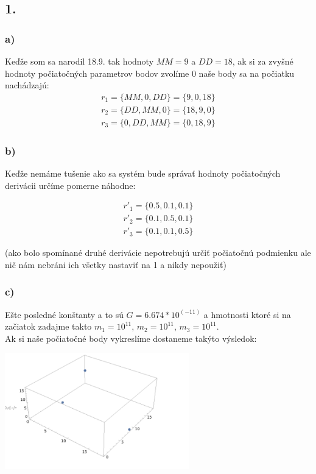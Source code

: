 \documentclass[a4paper]{article}
\begin{document}
	\subsection{1.}
	\subsubsection{a)}
	Keďže som sa narodil 18.9. tak hodnoty $MM=9$ a $DD=18$, ak si za zvyšné hodnoty počiatočných parametrov bodov zvolíme 0 naše body sa na počiatku nachádzajú:
	\begin{align*}
		r_1=\{MM, 0,DD\} = \{9,0,18\}\\
		r_2=\{DD,MM, 0\}= \{18, 9,0\}\\
		r_3=\{0, DD, MM\}= \{0,18,9\}
	\end{align*}
	
	\subsubsection{b)}
	Keďže nemáme tušenie ako sa systém bude správať hodnoty počiatočných derivácii určíme pomerne náhodne:
	
	\begin{align*}
		r'_1=\{0.5,0.1,0.1\}\\
		r'_2=\{0.1,0.5,0.1\}\\
		r'_3=\{0.1,0.1,0.5\}
	\end{align*}
	
	(ako bolo spomínané druhé derivácie nepotrebujú určiť počiatočnú podmienku ale nič nám nebráni ich všetky nastaviť na 1 a nikdy nepoužiť)
	
	\subsubsection{c)}
	
	Ešte posledné konštanty a to sú $G=6.674*10^(-11)$ a hmotnosti ktoré si na začiatok zadajme takto $m_1= 10^11$, $m_2=10^11$, $m_3=10^11$.
	\\
	
	Ak si naše počiatočné body vykreslíme dostaneme takýto výsledok:
	
	\centerline{\includegraphics[width=0.6\textwidth]{pociatok}}
	
\end{document}
